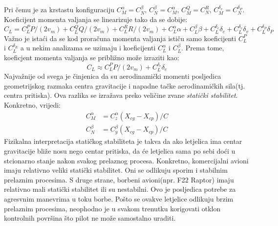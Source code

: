  Pri čemu je za krstastu konfiguraciju $C_M^{\alpha}=C_N^{\beta}$, $C_N^{\dot{\beta}}=C_M^{\dot{\alpha}}$,
 $ C_M^Q=C_N^R $, $C_M^{\delta _v}=C_N^{\delta _P}$.
 Koeficijent momenta valjanja se linearizuje tako da se dobije:
 \begin{equation}
     C_L = C_L^PP/(2v_m)+C_L^QQ/(2v_m)+C_L^RR/(2v_m) +C_L^\alpha \alpha +C_L^\beta \beta + C_L^{\delta _e} \delta _e +C_L^{\delta _v} \delta _v
     +C_L^{\delta _P} \delta _P
 \end{equation}
 Važno je istaći da se kod proračuna momenta valjanja ističu samo koeficijenti $C_L^P$ i $C_L^{\delta _E}$ a u nekim analizama 
 se uzimaju i koeficijenti $C_L^\alpha$ i $C_L^\beta$. Prema tome, koeficjent momenta 
 valjanja se približno može izraziti kao:
 \begin{equation}
    C_L \approx C_L^PP/(2v_m)+C_L^{\delta _e} \delta _e
 \end{equation}
 Najvažnije od svega je činjenica da su aerodinamički momenti posljedica 
 geometrijskog razmaka centra gravitacije i napadne tačke aerodinamičkih sila(tj. centra pritiska).
 Ova razlika se izražava preko veličine zvane \textit{statički stabilitet}. Konkretno, vrijedi:
\begin{align}
    C_M^\alpha &= C_z^\alpha(X_{cg}-X_{cp})/C\\
    C_N^\beta &= C_y^\beta(X_{cg}-X_{cp})/C
\end{align}
Fizikalna interpretacija statičkog stabiliteta je takva da ako letjelica ima centar gravitacije bliže nosu nego 
centar pritiska, da će letjelica sama po sebi doći u stcionarno stanje nakon svakog prelaznog procesa. 
Konkretno, komercijalni avioni imaju relativno veliki statički stabilitet. Oni se odlikuju sporim i stabilnim 
prelaznim procesima. S druge strane, borbeni avioni(npr. F22 Raptor) imaju relativno mali statički stabilitet ili su 
nestabilni. Ovo je posljedica potrebe za agresvnim manevrima u toku borbe. Pošto se ovakve letjelice odlikuju brzim prelaznim 
procesima, neophodno je u svakom trenutku korigovati otklon kontrolnih površina što pilot ne može samostalno uraditi. 
